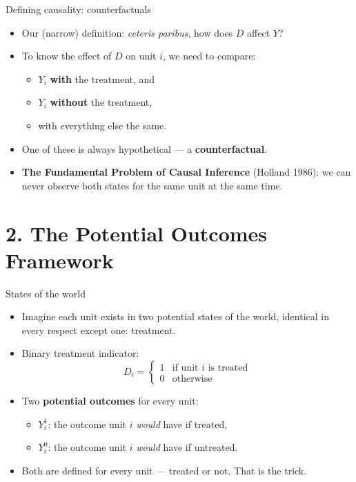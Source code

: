 \documentclass[
  11pt,
  ignorenonframetext,
  aspectratio=169,
]{beamer}
\providecommand{\tightlist}{%
  \setlength{\itemsep}{0pt}\setlength{\parskip}{0pt}}
\begin{document}
\begin{frame}{Defining causality: counterfactuals}
\protect{}\label{defining-causality-counterfactuals}
\begin{itemize}
\tightlist
\item
  Our (narrow) definition: \emph{ceteris paribus}, how does \(D\) affect
  \(Y\)?
\item
  To know the effect of \(D\) on unit \(i\), we need to compare:

  \begin{itemize}
  \tightlist
  \item
    \(Y_i\) \textbf{with} the treatment, and
  \item
    \(Y_i\) \textbf{without} the treatment,
  \item
    with everything else the same.
  \end{itemize}
\item
  One of these is always hypothetical --- a \textbf{counterfactual}.
\item
  \textbf{The Fundamental Problem of Causal Inference} (Holland 1986):
  we can never observe both states for the same unit at the same time.
\end{itemize}
\end{frame}

\section{2. The Potential Outcomes
Framework}\label{the-potential-outcomes-framework}

\begin{frame}{States of the world}
\protect{}\label{states-of-the-world}
\begin{itemize}
\tightlist
\item
  Imagine each unit exists in two potential states of the world,
  identical in every respect except one: treatment.
\item
  Binary treatment indicator: \[
  D_i = \begin{cases} 1 & \text{if unit } i \text{ is treated} \\ 0 & \text{otherwise} \end{cases}
  \]
\item
  Two \textbf{potential outcomes} for every unit:

  \begin{itemize}
  \tightlist
  \item
    \(Y_i^1\): the outcome unit \(i\) \emph{would} have if treated,
  \item
    \(Y_i^0\): the outcome unit \(i\) \emph{would} have if untreated.
  \end{itemize}
\item
  Both are defined for every unit --- treated or not. That is the trick.
\end{itemize}
\end{frame}
\end{document}
